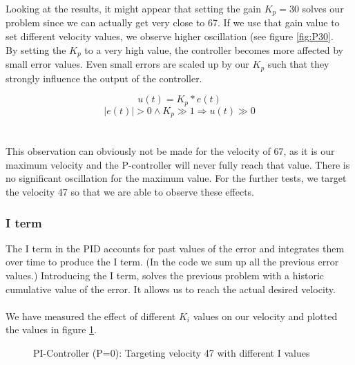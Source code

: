 \noindent
Looking at the results, it might appear that setting the gain $K_p = 30$ solves our problem since we can actually get very close to 67. If we use that gain value to set different velocity values, we observe higher oscillation (see figure \ref{fig:P30}.\\
By setting the $K_p$ to a very high value, the controller becomes more affected by small error values. Even small errors are scaled up by our $K_p$ such that they strongly influence the output of the controller.

$$u(t) = K_p * e(t)$$
$$|e(t)| > 0 \wedge K_p \gg 1 \Rightarrow u(t) \gg 0$$\\\\

\noindent
This observation can obviously not be made for the velocity of 67, as it is our maximum velocity and the P-controller will never fully reach that value. There is no significant oscillation for the maximum value. For the further tests, we target the velocity 47 so that we are able to observe these effects.

\subsubsection*{I term}
The I term in the PID accounts for past values of the error and integrates them over time to produce the I term. (In the code we sum up all the previous error values.)
Introducing the I term, solves the previous problem with a historic cumulative value of the error. It allows us to reach the actual desired velocity.\\\\
We have measured the effect of different $K_i$ values on our velocity and plotted the values in figure \ref{fig:I_demo}.

\begin{figure}[H]
    \centering
{}
    \caption{PI-Controller (P=0): Targeting velocity 47 with different I values} \label{fig:I_demo}
\end{figure}

